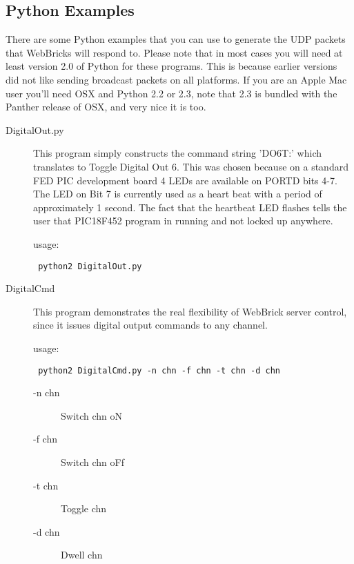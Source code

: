 \subsection{Python Examples}

There are some Python examples that you can use to generate the UDP packets that WebBricks will respond to.  
Please note that in most cases you will need at least version 2.0 of Python for these programs.  This is 
because earlier versions did not like sending broadcast packets on all platforms. If you are an Apple Mac 
user you'll need OSX and Python 2.2 or 2.3, note that 2.3 is bundled with the Panther release of OSX, and 
very nice it is too.


\begin{description}

\item[DigitalOut.py]

This program simply constructs the command string 'DO6T:' which translates to Toggle Digital Out 6.  
This was chosen because on a standard FED PIC development board 4 LEDs are available on PORTD bits 4-7.  
The LED on Bit 7 is currently used as a heart beat with a period of approximately 1 second.  The fact that 
the heartbeat LED flashes tells the user that PIC18F452 program in running and not locked up anywhere.

usage:  \begin{verbatim} python2 DigitalOut.py \end{verbatim}

\item[DigitalCmd]

This program demonstrates the real flexibility of WebBrick server control, since it issues digital output 
commands to any channel.

usage:  \begin{verbatim} python2 DigitalCmd.py -n chn -f chn -t chn -d chn\end{verbatim}

	\begin{description}
	\item[-n chn]  Switch chn oN  
	\item[-f chn]  Switch chn oFf  
	\item[-t chn]  Toggle chn  
	\item[-d chn]  Dwell chn 
	\end{description}




\end{description}
